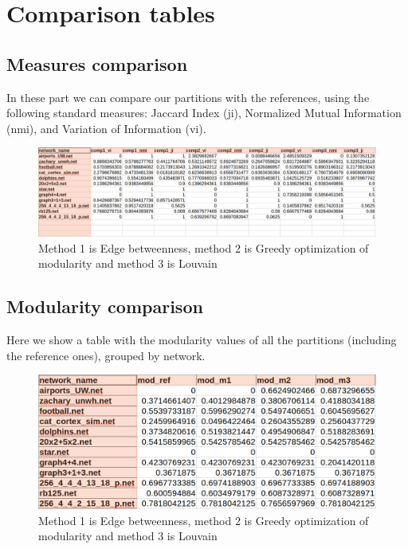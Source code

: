 \documentclass{article}
\begin{document}
\newpage
\section{Comparison tables}
  \subsection{Measures comparison}
    In these part we can compare our partitions with the references, using the following standard measures: Jaccard Index (ji), Normalized Mutual Information (nmi), and Variation of Information (vi).
    \begin{figure}[H]
      \centering
      \includegraphics[width=1 \textwidth]{"../../output_good/community_comparison"}
      \caption{Method 1 is Edge betweenness, method 2 is Greedy optimization of modularity and method 3 is Louvain}
    \end{figure}

  \subsection{Modularity comparison}
    Here we show a table with the modularity values of all the partitions (including the reference ones), grouped by network.
    \begin{figure}[H]
      \centering
      \includegraphics[width=0.8 \textwidth]{"../../output_good/community_modularity"}
      \caption{Method 1 is Edge betweenness, method 2 is Greedy optimization of modularity and method 3 is Louvain}
    \end{figure}

\newpage
\end{document}
